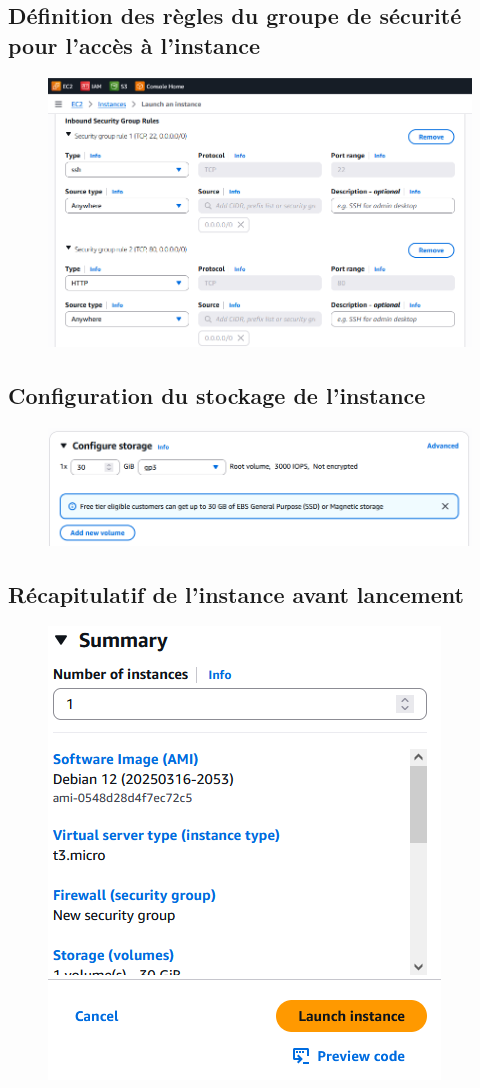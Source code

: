 \subsection{Définition des règles du groupe de sécurité pour l’accès à l’instance}
\begin{figure}[h!]
	\centering
	\includegraphics[width=0.7\linewidth]{corps/images/image6}
	\label{fig:6}
\end{figure}

\subsection{Configuration du stockage de l’instance}
\begin{figure}[h!]
	\centering
	\includegraphics[width=0.9\linewidth]{corps/images/image7}
	\label{fig:7}
\end{figure}
\newpage
\subsection{Récapitulatif de l'instance avant lancement}
\begin{figure}[h!]
	\centering
	\includegraphics[width=0.6\linewidth]{corps/images/image8}
	\label{fig:8}
\end{figure}

